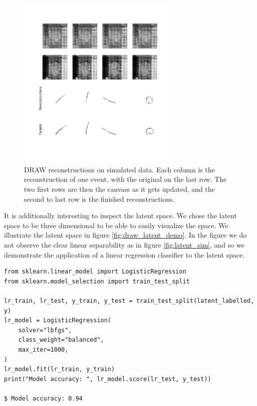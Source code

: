 \begin{figure}[ht]
	\centering
	\includegraphics[width=0.7\textwidth]{reconst.pdf}
	\caption[DRAW reconstructions on simulated data]{DRAW reconstructions on simulated data. Each column is the reconstruction of one event, with the original on the last row. The two first rows are then the canvass as it gets updated, and the second to last row is the finished reconstructions.}
	\label{fig:draw_reconst}
\end{figure}

It is additionally interesting to inspect the latent space. We chose the latent space to be three dimensional to be able to easily visualize the space. We illustrate the latent space in figure \ref{fig:draw_latent_demo}. In the figure we do not observe the clear linear separability as in figure \ref{fig:latent_sim}, and so we demonstrate the application of a linear regression classifier to the latent space.

\begin{minipage}{\linewidth}
\begin{lstlisting}[language=iPython]
from sklearn.linear_model import LogisticRegression
from sklearn.model_selection import train_test_split

lr_train, lr_test, y_train, y_test = train_test_split(latent_labelled, y)
lr_model = LogisticRegression(
	solver="lbfgs",
	class_weight="balanced",
	max_iter=1000,
)
lr_model.fit(lr_train, y_train)
print("Model accuracy: ", lr_model.score(lr_test, y_test))

$ Model accuracy: 0.94
\end{lstlisting}
\end{minipage}

